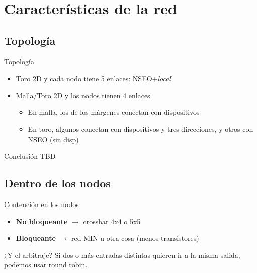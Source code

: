 \section{Características de la red}

\subsection{Topología}
\begin{frame}{Topología}
    \begin{itemize}
        \item Toro 2D y cada nodo tiene 5 enlaces: NSEO+\textit{local}
        \item Malla/Toro 2D y los nodos tienen 4 enlaces
        \begin{itemize}
            \item En malla, los de los márgenes conectan con dispositivos
            \item En toro, algunos conectan con dispositivos y tres direcciones, y otros con NSEO (sin disp)
        \end{itemize}
    \end{itemize}
    \begin{exampleblock}{Conclusión}
        TBD
    \end{exampleblock}
\end{frame}

\subsection{Dentro de los nodos}
\begin{frame}{Contención en los nodos}
    \begin{itemize}
        \item \textbf{No bloqueante} $\rightarrow$ crossbar 4x4 o 5x5
        \item \textbf{Bloqueante} $\rightarrow$ red MIN u otra cosa (menos transistores)
    \end{itemize}
    
    \begin{alertblock}{¿Y el arbitraje?}
        Si dos o más entradas distintas quieren ir a la misma salida, podemos usar round robin.
    \end{alertblock}
\end{frame}